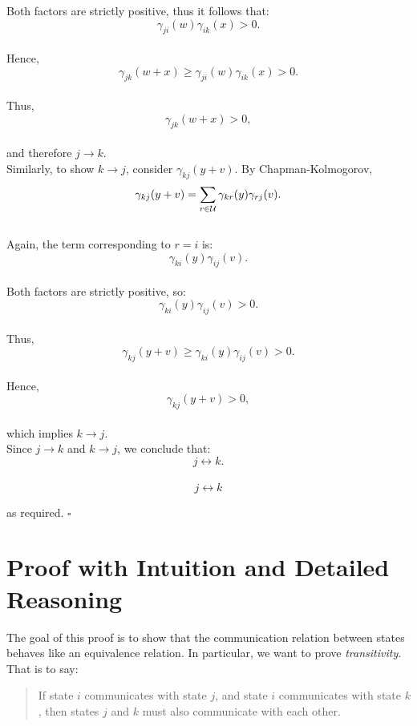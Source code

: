 \documentclass[12pt]{article}
\begin{document}
Both factors are strictly positive, thus it follows that: \\
\[
\gamma_{ji}(w)\gamma_{ik}(x) > 0.
\]\\

Hence,\\
\[
\gamma_{jk}(w+x)
\geq
\gamma_{ji}(w)\gamma_{ik}(x)
>0.
\]\\

Thus,\\
\[
\gamma_{jk}(w+x)>0,
\]\\
and therefore $j \to k$.\\


Similarly, to show $k \to j$, consider $\gamma_{kj}(y+v)$. By Chapman-Kolmogorov,\\
\[
\gamma_{kj}(y+v)
=
\sum_{r\in \cal{U}}\gamma_{kr}(y)\gamma_{rj}(v).
\]\\

Again, the term corresponding to $r=i$ is:
\[
\gamma_{ki}(y)\gamma_{ij}(v).
\]\\

Both factors are strictly positive, so:
\[
\gamma_{ki}(y)\gamma_{ij}(v)>0.
\]\\

Thus,\\
\[
\gamma_{kj}(y+v)
\geq
\gamma_{ki}(y)\gamma_{ij}(v)
>0.
\]\\

Hence,\\
\[
\gamma_{kj}(y+v)>0,
\]\\
which implies $k \to j$.\\

Since $j \to k$ and $k \to j$, we conclude that: \\
\[
j \leftrightarrow k.
\]\\

\[
\boxed{j \leftrightarrow k}
\]

as required. \hfill $\square$

\newpage

\section*{Proof with Intuition and Detailed Reasoning}

The goal of this proof is to show that the communication relation between states behaves like an equivalence relation. In particular, we want to prove \textit{transitivity}. That is to say:\\

\begin{quote}
If state $i$ communicates with state $j$, and state $i$ communicates with state $k$, then states $j$ and $k$ must also communicate with each other.\\
\end{quote}
\end{document}
